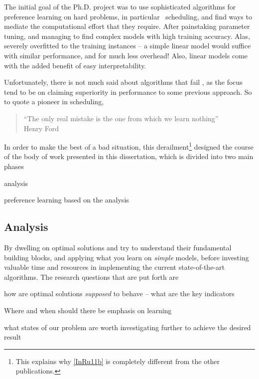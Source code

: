 The initial goal of the Ph.D. project was to use sophisticated algorithms for 
preference learning on hard problems, in particular \jsp\ scheduling, and find 
ways to mediate the computational effort that they require.
After painstaking parameter tuning, and managing to find complex models 
with high training accuracy. Alas, severely overfitted to the training 
instances -- a simple linear model would suffice with similar performance, and 
for much less overhead! Also, linear models come with the added benefit of easy 
interpretability. 

Unfortunately, there is not much said about algorithms that fail 
\citep{SmithMiles2015}, as the focus tend to be on claiming superiority in 
performance to some previous approach.
So to quote a pioneer in scheduling, 
\begin{quote}
    ``The only real mistake is the one from which we learn nothing'' \\
    \raggedleft Henry Ford
\end{quote}
In order to make the best of a bad situation, this derailment\footnote{
    This explains why \cref{InRu11b} is completely different from the other 
    publications.} 
designed the course of the body of work presented in this dissertation, which 
is divided into two main phases
\begin{enumerate*}
    \item analysis
    \item preference learning based on the analysis
\end{enumerate*} 

\subsection*{Analysis}
By dwelling on optimal solutions and try to understand 
their fundamental building blocks, and applying what you learn on \emph{simple} 
models, before investing valuable time and resources in implementing the 
current state-of-the-art algorithms. 
The research questions that are put forth are
\begin{enumerate*}[itemjoin={{? }}, itemjoin*={{? And ultimately, }},
    after={{?}}]
    \item how are optimal solutions \emph{supposed} to behave -- what are the 
    key indicators
    \item Where and when should there be emphasis on learning
    \item what states of our problem are worth investigating further to achieve 
    the desired result
\end{enumerate*}

